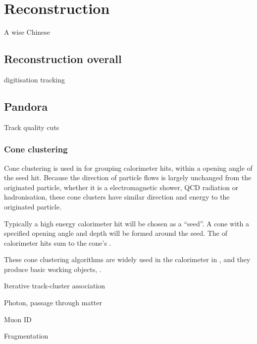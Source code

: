 \chapter{Reconstruction}
\label{chap:Reconstruction}

%
{A wise Chinese}%


\section{Reconstruction overall}
digitisation
tracking

\section{Pandora}

Track quality cuts

\subsection{Cone clustering}
\label{sec:pandoraConeClustering}


Cone clustering is used in \pandora for grouping calorimeter hits, within a opening angle of the seed hit. Because the direction of particle flows is largely unchanged from the originated particle, whether it is a electromagnetic shower, QCD radiation or hadronisation, these cone clusters have similar direction and energy to the originated particle.

Typically a high energy calorimeter hit will be chosen as a ``seed''. A cone with a specified opening angle and depth will be formed around the seed. The \fourMomentum of calorimeter hits sum to the cone's \fourMomentum.

These cone clustering algorithms are widely used in the calorimeter in \pandora, and they produce basic working objects, \clusters.




Iterative track-cluster association

Photon, passage through matter

Muon ID

Fragmentation
